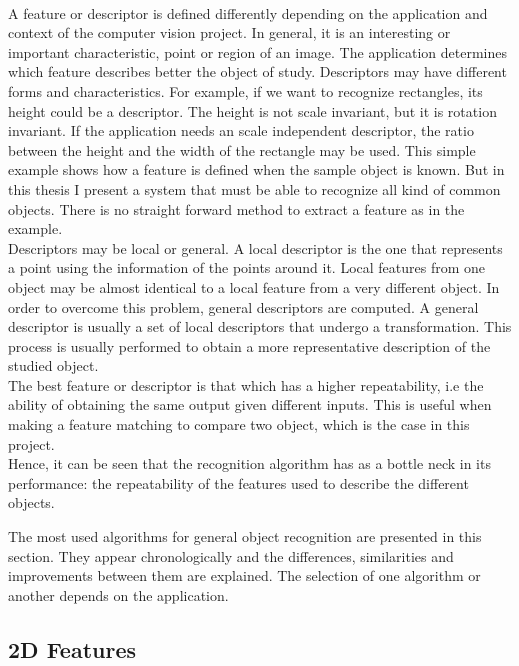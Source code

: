 \\
A feature or descriptor is defined differently depending on the application and context of the computer vision project. 
In general, it is an interesting or important characteristic, point or region of an image. 
The application determines which feature describes better the object of study. 
Descriptors may have different forms and characteristics. 
For example, if we want to recognize rectangles, its height could be a descriptor.
The height is not scale invariant, but it is rotation invariant. 
If the application needs an scale independent descriptor, the ratio between the height and the width of the rectangle may be used. 
This simple example shows how a feature is defined when the sample object is known. 
But in this thesis I present a system that must be able to recognize all kind of common objects. 
There is no straight forward method to extract a feature as in the example. 
\\

Descriptors may be local or general. 
A local descriptor is the one that represents a point using the information of the points around it. 
Local features from one object may be almost identical to a local feature from a very different object. 
In order to overcome this problem, general descriptors are computed. 
A general descriptor is usually a set of local descriptors that undergo a transformation. 
This process is usually performed to obtain a more representative description of the studied object. 
\\

The best feature or descriptor is that which has a higher repeatability, i.e the ability of obtaining the same output given different inputs. 
This is useful when making a feature matching to compare two object, which is the case in this project. 
\\

Hence, it can be seen that the recognition algorithm has as a bottle neck in its performance: the repeatability of the features used to describe the different objects. 

The most used algorithms for general object recognition are presented in this section. 
They appear chronologically and the differences, similarities and improvements between them are explained. 
The selection of one algorithm or another depends on the application.
\\

\subsection{2D Features}
\label{2d_features}

